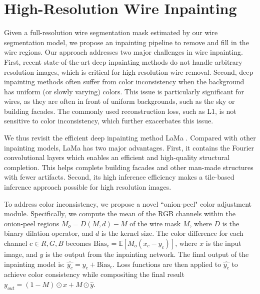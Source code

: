 \section{High-Resolution Wire Inpainting}
\label{sec:inpainting}
Given a full-resolution wire segmentation mask estimated by our wire segmentation model, we propose an inpainting pipeline to remove and fill in the wire regions. Our approach addresses two major challenges in wire inpainting. First, recent state-of-the-art deep inpainting methods do not handle arbitrary resolution images, which is critical for high-resolution wire removal. Second, deep inpainting methods often suffer from color inconsistency when the background has uniform (or slowly varying) colors. This issue is particularly significant for wires, as they are often in front of uniform backgrounds, such as the sky or building facades. The commonly used reconstruction loss, such as L1, is not sensitive to color inconsistency, which further exacerbates this issue.

We thus revisit the efficient deep inpainting method LaMa \cite{suvorov2022resolution}. Compared with other inpainting models, LaMa has two major advantages. First, it contains the Fourier convolutional layers which enables an efficient and high-quality structural completion. This helps complete building facades and other man-made structures with fewer artifacts. Second, its high inference efficiency makes a tile-based inference approach possible for high resolution images. 

To address color inconsistency, we propose a novel ``onion-peel" color adjustment module. Specifically, we compute the mean of the RGB channels within the onion-peel regions $M_o = D(M, d) - M$ of the wire mask $M$, where $D$ is the binary dilation operator, and $d$ is the kernel size. The color difference for each channel $c \in {R, G, B}$ becomes $\textrm{Bias}_c = \mathbb{E}[M_o (x_c - y_c)]$, where $x$ is the input image, and $y$ is the output from the inpainting network. The final output of the inpainting model is: $\hat{y_c} = y_c + \textrm{Bias}_{c}$. Loss functions are then applied to $\hat{y_c}$ to achieve color consistency while compositing the final result $y_{out} = (1 - M) \odot x + M \odot \hat{y}$. 

